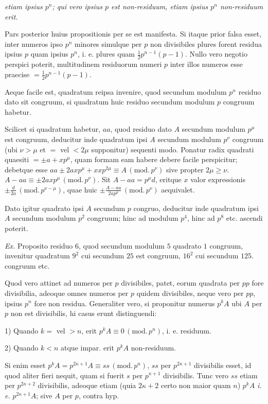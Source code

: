 \emph{etiam ipsius $p^n$; qui vero ipsius $p$ est non-residuum, etiam ipsius $p^n$ non-residuum erit.}

Pars posterior huius propositionis per se est manifesta. Si itaque prior falsa esset, inter numeros ipso $p^n$ minores simulque per $p$ non divisibiles plures forent residua ipsius $p$ quam ipsius $p^n$, i. e. plures quam $\frac{1}{2}p^{n-1}(p-1)$. Nullo vero negotio perspici poterit, multitudinem residuorum numeri $p$ inter illos numeros esse praecise $=\frac{1}{2}p^{n-1}(p-1)$.

Aeque facile est, quadratum reipsa invenire, quod secundum modulum $p^n$ residuo dato sit congruum, si quadratum huic residuo secundum modulum $p$ congruum habetur.

Scilicet si quadratum habetur, $aa$, quod residuo dato $A$ secundum modulum $p^\mu$ est congruum, deducitur inde quadratum ipsi $A$ secundum modulum $p^\nu$ congruum (ubi $\nu>\mu$ et $=$ vel $<2\mu$ supponitur) sequenti modo. Ponatur radix quadrati quaesiti $=\pm a+xp^\mu$, quam formam eam habere debere facile perspicitur; debetque esse $aa\pm2axp^\mu+xxp^{2\mu}\equiv A\,(\mathrm{mod.}\,p^\nu)$ sive propter $2\mu\geq\nu$. $A-aa\equiv\pm2axp^\mu\,(\mathrm{mod.}\,p^\nu)$. Sit $A-aa=p^{\mu}d$, eritque $x$ valor expressionis $\pm\frac{d}{2a}\,(\mathrm{mod.}\,p^{\nu-\mu})$, quae huic $\pm\frac{A-aa}{2ap^\mu}\,(\mathrm{mod.}\,p^\nu)$ aequivalet.

Dato igitur quadrato ipsi $A$ secundum $p$ congruo, deducitur inde quadratum ipsi $A$ secundum modulum $p^2$ congruum; hinc ad modulum $p^4$, hinc ad $p^8$ etc. ascendi poterit.

\emph{Ex.} Proposito residuo $6$, quod secundum modulum $5$ quadrato $1$ congruum, invenitur quadratum $9^2$ cui secundum $25$ est congruum, $16^2$ cui secundum $125$. congruum etc.


Quod vero attinet ad numeros per $p$ divisibiles, patet, eorum quadrata per $pp$ fore divisibilia, adeoque omnes numeros per $p$ quidem divisibiles, neque vero per $pp$, ipsius $p^n$ fore non residua. Generaliter vero, si proponitur numerus $p^k A$ ubi $A$ per $p$ non est divisibilis, hi casus erunt distinguendi:

1) Quando $k=$ vel $>n$, erit $p^k A\equiv0\,(\mathrm{mod.}\,p^n)$, i. e. residuum.

2) Quando $k<n$ atque impar. erit $p^k A$ non-residuum.

Si enim esset $p^k A=p^{2\kappa+1}A\equiv ss\,(\mathrm{mod.}\,p^n)$, $ss$ per $p^{2\kappa+1}$ divisibilis esset, id quod aliter fieri nequit, quam si fuerit $s$ per $p^{\kappa+1}$ divisibilis. Tunc vero $ss$
etiam per $p^{2\kappa+2}$ divisibilis, adeoque etiam (quia $2\kappa+2$ certo non maior quam $n$) $p^k A$ \emph{i. e.} $p^{2\kappa+1}A$; sive $A$ per $p$, contra hyp.

